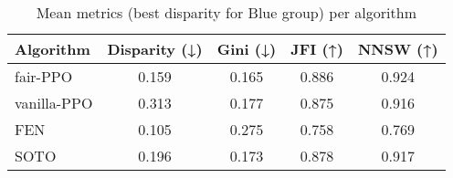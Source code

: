 \begin{table}
\caption{Mean metrics (best disparity for Blue group) per algorithm}
\label{tab:best_configs_metrics_blue}
\begin{tabular}{lcccc}
\toprule
Algorithm & Disparity (↓) & Gini (↓) & JFI (↑) & NNSW (↑) \\
\midrule
fair-PPO & 0.159 & 0.165 & 0.886 & 0.924 \\
vanilla-PPO & 0.313 & 0.177 & 0.875 & 0.916 \\
FEN & 0.105 & 0.275 & 0.758 & 0.769 \\
SOTO & 0.196 & 0.173 & 0.878 & 0.917 \\
\bottomrule
\end{tabular}
\end{table}
